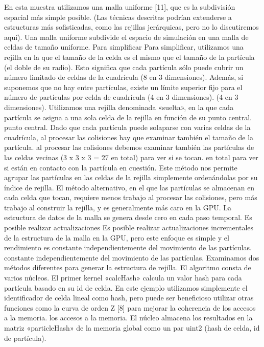 En esta muestra utilizamos una malla uniforme [11], que es la subdivisión espacial más simple posible. (Las
técnicas descritas podrían extenderse a estructuras más sofisticadas, como las rejillas jerárquicas,
pero no lo discutiremos aquí).
Una malla uniforme subdivide el espacio de simulación en una malla de celdas de tamaño uniforme. Para simplificar
Para simplificar, utilizamos una rejilla en la que el tamaño de la celda es el mismo que el tamaño de la partícula (el doble de su radio). Esto significa que
cada partícula sólo puede cubrir un número limitado de celdas de la cuadrícula (8 en 3 dimensiones). Además, si suponemos que no hay
entre partículas, existe un límite superior fijo para el número de partículas por celda de cuadrícula (4 en 3 dimensiones).
(4 en 3 dimensiones).
Utilizamos una rejilla denominada «suelta», en la que cada partícula se asigna a una sola celda de la rejilla en función de su punto central.
punto central. Dado que cada partícula puede solaparse con varias celdas de la cuadrícula, al procesar las colisiones hay que examinar también el tamaño de la partícula.
al procesar las colisiones debemos examinar también las partículas de las celdas vecinas (3 x 3 x 3 = 27 en total) para ver si se tocan.
en total para ver si están en contacto con la partícula en cuestión. Este método nos permite agrupar las partículas
en las celdas de la rejilla simplemente ordenándolas por su índice de rejilla.
El método alternativo, en el que las partículas se almacenan en cada celda que tocan, requiere menos trabajo
al procesar las colisiones, pero más trabajo al construir la rejilla, y es generalmente más caro
en la GPU.
La estructura de datos de la malla se genera desde cero en cada paso temporal. Es posible realizar actualizaciones
Es posible realizar actualizaciones incrementales de la estructura de la malla en la GPU, pero este enfoque es simple y el rendimiento es constante independientemente del movimiento de las partículas.
constante independientemente del movimiento de las partículas.
Examinamos dos métodos diferentes para generar la estructura de rejilla.
El algoritmo consta de varios núcleos. El primer kernel «calcHash» calcula un valor hash para
cada partícula basado en su id de celda. En este ejemplo utilizamos simplemente el identificador de celda lineal como hash, pero
puede ser beneficioso utilizar otras funciones como la curva de orden Z [8] para mejorar la coherencia de los accesos a la memoria.
los accesos a la memoria. El núcleo almacena los resultados en la matriz «particleHash» de la memoria global como
un par uint2 (hash de celda, id de partícula).
